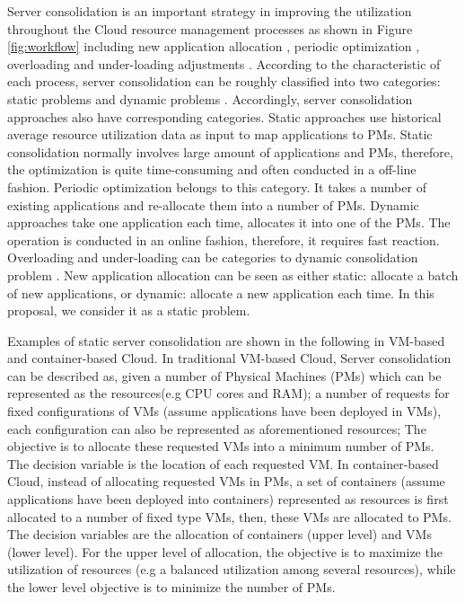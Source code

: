Server consolidation is an important strategy in improving the utilization throughout the Cloud resource management processes as shown in Figure \ref{fig:workflow} including new application allocation \cite{Jennings:2015ht}, periodic optimization \cite{Mishra:2012kx}, overloading and under-loading adjustments \cite{Mishra:2012kx}. According to the characteristic of each process, server consolidation can be roughly classified into two categories: static problems \cite{Mishra:2012kx} and dynamic problems \cite{Beloglazov:2012bw}.
Accordingly, server consolidation approaches also have corresponding categories. Static approaches use historical average resource utilization data as input to map applications to PMs. Static consolidation normally involves large amount of applications and PMs, therefore, the optimization is quite time-consuming and often conducted in a off-line fashion. Periodic optimization belongs to this category. It takes a number of existing applications and re-allocate them into a number of PMs. 
Dynamic approaches take one application each time, allocates it into one of the PMs. The operation is conducted in an online fashion, therefore, it requires fast reaction. Overloading  and under-loading can be categories to dynamic consolidation problem \cite{Beloglazov:2013ht}. New application allocation can be seen as either static: allocate a batch of new applications, or dynamic: allocate a new application each time. In this proposal, we consider it as a static problem. 

Examples of static server consolidation are shown in the following in VM-based and container-based Cloud. In traditional VM-based Cloud, Server consolidation can be described as, given a number of Physical Machines (PMs) which can be represented as the resources(e.g CPU cores and RAM); a number of requests for fixed configurations of VMs (assume applications have been deployed in VMs), each configuration can also be represented as aforementioned resources; The objective is to allocate these requested VMs into a minimum number of PMs. The decision variable is the location of each requested VM. In container-based Cloud, instead of allocating requested VMs in PMs, a set of containers (assume applications have been deployed into containers) represented as resources is first allocated to a number of fixed type VMs, then, these VMs are allocated to PMs. The decision variables are the allocation of containers (upper level) and VMs (lower level). For the upper level of allocation, the objective is to maximize the utilization of resources (e.g a balanced utilization among several resources), while the lower level objective is to minimize the number of PMs.


